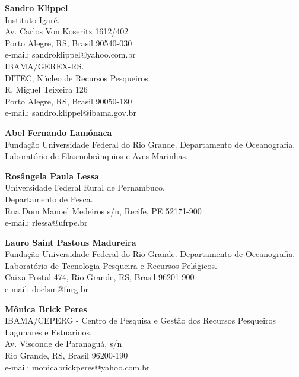 \documentclass[a4paper,11pt,twoside,showtrims,onecolumn,openright,final]{memoir}
\begin{document}
\begin{scriptsize}
\begin{flushleft}
\textbf{Sandro Klippel} \\
\vspace{1pt}
Instituto Igaré.  \\
Av. Carlos Von Koseritz 1612/402 \\
Porto Alegre, RS, Brasil 90540-030 \\
e-mail: sandroklippel@yahoo.com.br \\
\vspace{1pt}
IBAMA/GEREX-RS. \\
DITEC, Núcleo de Recursos Pesqueiros. \\
R. Miguel Teixeira 126 \\
Porto Alegre, RS, Brasil 90050-180 \\
e-mail: sandro.klippel@ibama.gov.br

\vspace{3\baselineskip}

\textbf{Abel Fernando Lamónaca} \\
\vspace{1pt}
Fundação Universidade Federal do Rio Grande.
Departamento de Oceanografia.
Laboratório de Elasmobrânquios e Aves Marinhas.

\textbf{Rosângela Paula Lessa} \\
\vspace{1pt}
Universidade Federal Rural de Pernambuco. \\
Departamento de Pesca. \\
Rua Dom Manoel Medeiros s/n, Recife, PE 52171-900 \\
e-mail: rlessa@ufrpe.br

\textbf{Lauro Saint Pastous Madureira} \\
\vspace{1pt}
Fundação Universidade Federal do Rio Grande.
Departamento de Oceanografia.
Laboratório de Tecnologia Pesqueira e Recursos Pelágicos. \\
Caixa Postal 474, Rio Grande, RS, Brasil 96201-900 \\
e-mail: doclsm@furg.br

\textbf{Mônica Brick Peres} \\
\vspace{1pt}
IBAMA/CEPERG - Centro de Pesquisa e Gestão dos Recursos Pesqueiros Lagunares e Estuarinos. \\
Av. Visconde de Paranaguá, s/n \\
Rio Grande, RS, Brasil 96200-190 \\
e-mail: monicabrickperes@yahoo.com.br


\end{flushleft}
\end{scriptsize}
\end{document}
